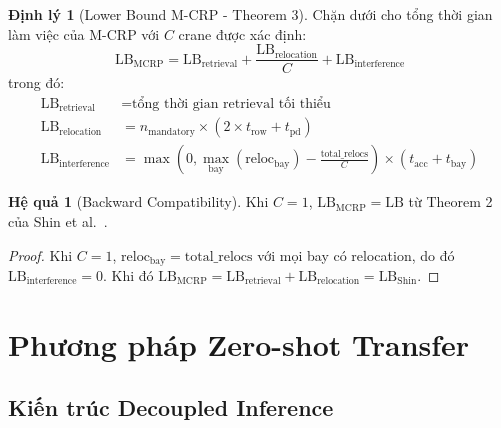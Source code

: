\documentclass[11pt,a4paper]{article}
\theoremstyle{definition}
\newtheorem{theorem}{Định lý}[section]
\newtheorem{corollary}{Hệ quả}[section]
\newcommand{\1}{\mathbbm{1}}
\begin{document}
\begin{theorem}[Lower Bound M-CRP - Theorem 3]
\label{thm:lb_mc}
Chặn dưới cho tổng thời gian làm việc của M-CRP với $C$ crane được xác định:
\begin{equation}
    \text{LB}_{\text{MCRP}} = \text{LB}_{\text{retrieval}} + \frac{\text{LB}_{\text{relocation}}}{C} + \text{LB}_{\text{interference}}
\end{equation}
trong đó:
\begin{align}
    \text{LB}_{\text{retrieval}} &= \text{tổng thời gian retrieval tối thiểu} \\
    \text{LB}_{\text{relocation}} &= n_{\text{mandatory}} \times (2 \times t_{\text{row}} + t_{\text{pd}}) \\
    \text{LB}_{\text{interference}} &= \max\left(0, \max_{\text{bay}} (\text{reloc}_{\text{bay}}) - \frac{\text{total\_relocs}}{C}\right) \times (t_{\text{acc}} + t_{\text{bay}})
\end{align}
\end{theorem}

\begin{corollary}[Backward Compatibility]
Khi $C = 1$, $\text{LB}_{\text{MCRP}} = \text{LB}$ từ Theorem 2 của Shin et al.~\cite{shin2026}.
\end{corollary}

\begin{proof}
Khi $C = 1$, $\text{reloc}_{\text{bay}} = \text{total\_relocs}$ với mọi bay có relocation, do đó $\text{LB}_{\text{interference}} = 0$. Khi đó $\text{LB}_{\text{MCRP}} = \text{LB}_{\text{retrieval}} + \text{LB}_{\text{relocation}} = \text{LB}_{\text{Shin}}$.
\end{proof}

\section{Phương pháp Zero-shot Transfer}

\subsection{Kiến trúc Decoupled Inference}
\end{document}
